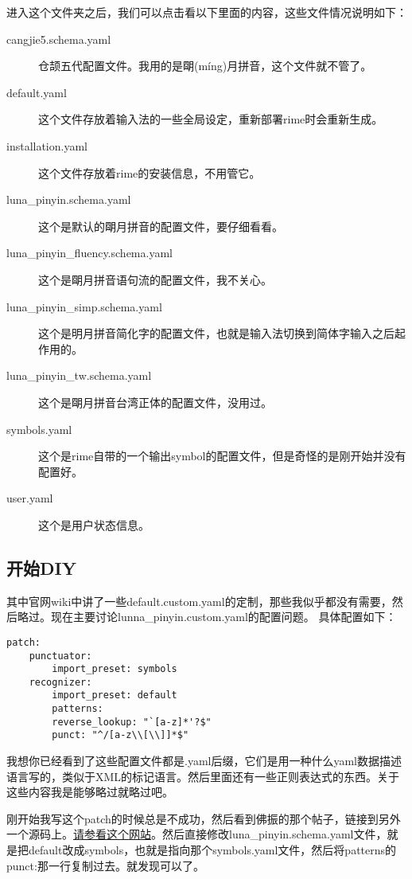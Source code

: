 进入这个文件夹之后，我们可以点击看以下里面的内容，这些文件情况说明如下：
\begin{description}
\item[cangjie5.schema.yaml] 仓颉五代配置文件。我用的是朙(míng)月拼音，这个文件就不管了。
\item[default.yaml] 这个文件存放着输入法的一些全局设定，重新部署rime时会重新生成。
\item[installation.yaml] 这个文件存放着rime的安装信息，不用管它。
\item[luna\_{}pinyin.schema.yaml] 这个是默认的朙月拼音的配置文件，要仔细看看。
\item[luna\_{}pinyin\_{}fluency.schema.yaml] 这个是朙月拼音语句流的配置文件，我不关心。
\item[luna\_{}pinyin\_{}simp.schema.yaml] 这个是明月拼音简化字的配置文件，也就是输入法切换到简体字输入之后起作用的。
\item[luna\_{}pinyin\_{}tw.schema.yaml] 这个是朙月拼音台湾正体的配置文件，没用过。
\item[symbols.yaml] 这个是rime自带的一个输出symbol的配置文件，但是奇怪的是刚开始并没有配置好。
\item[user.yaml] 这个是用户状态信息。
\end{description}

\subsection{开始DIY}
其中官网wiki中讲了一些default.custom.yaml的定制，那些我似乎都没有需要，然后略过。现在主要讨论lunna\_{}pinyin.custom.yaml的配置问题。
具体配置如下：   
\begin{verbatim}  
patch:
    punctuator:
        import_preset: symbols
    recognizer:
        import_preset: default
        patterns:
        reverse_lookup: "`[a-z]*'?$"
        punct: "^/[a-z\\[\\]]*$"  
\end{verbatim}

我想你已经看到了这些配置文件都是.yaml后缀，它们是用一种什么yaml数据描述语言写的，类似于XML的标记语言。然后里面还有一些正则表达式的东西。关于这些内容我是能够略过就略过吧。

刚开始我写这个patch的时候总是不成功，然后看到佛振的那个帖子，链接到另外一个源码上。\href{https://github.com/lotem/brise/blob/master/preset/luna_pinyin_fluency.schema.yaml#L103}{请参看这个网站}。然后直接修改luna\_{}pinyin.schema.yaml文件，就是把default改成symbols，也就是指向那个symbols.yaml文件，然后将patterns的punct:那一行复制过去。就发现可以了。

